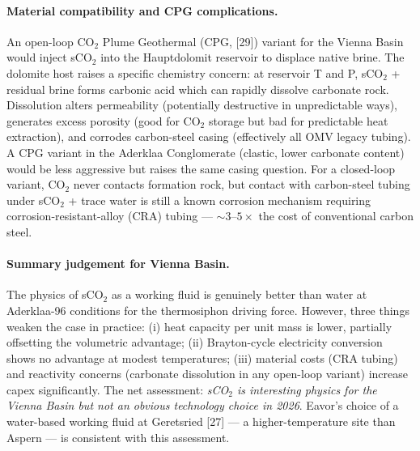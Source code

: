 \documentclass{article}
\begin{document}
\paragraph{Material compatibility and CPG complications.} An
open-loop CO$_2$ Plume Geothermal (CPG, [29]) variant for the
Vienna Basin would inject sCO$_2$ into the Hauptdolomit reservoir
to displace native brine. The dolomite host raises a specific
chemistry concern: at reservoir T and P, sCO$_2$ + residual
brine forms carbonic acid which can rapidly dissolve carbonate
rock. Dissolution alters permeability (potentially destructive
in unpredictable ways), generates excess porosity (good for CO$_2$
storage but bad for predictable heat extraction), and corrodes
carbon-steel casing (effectively all OMV legacy tubing). A CPG
variant in the Aderklaa Conglomerate (clastic, lower carbonate
content) would be less aggressive but raises the same casing
question. For a closed-loop variant, CO$_2$ never contacts
formation rock, but contact with carbon-steel tubing under
sCO$_2$ + trace water is still a known corrosion mechanism
requiring corrosion-resistant-alloy (CRA) tubing --- $\sim 3$--$5\times$
the cost of conventional carbon steel.

\paragraph{Summary judgement for Vienna Basin.} The physics of
sCO$_2$ as a working fluid is genuinely better than water at
Aderklaa-96 conditions for the thermosiphon driving force.
However, three things weaken the case in practice:
(i) heat capacity per unit mass is lower, partially offsetting
the volumetric advantage; (ii) Brayton-cycle electricity
conversion shows no advantage at modest temperatures; (iii)
material costs (CRA tubing) and reactivity concerns
(carbonate dissolution in any open-loop variant) increase capex
significantly. The net assessment: \emph{sCO$_2$ is interesting
physics for the Vienna Basin but not an obvious technology
choice in 2026}. Eavor's choice of a water-based working fluid
at Geretsried [27] --- a higher-temperature site than Aspern ---
is consistent with this assessment.
\end{document}
